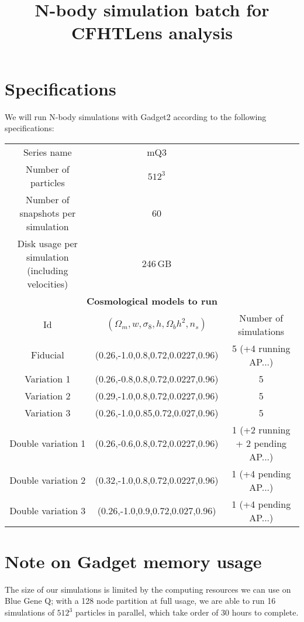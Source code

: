\documentclass[11pt]{article}
\begin{document}
\title{N-body simulation batch for CFHTLens analysis}
\author{}
\date{}

\maketitle

\section*{Specifications}

We will run N-body simulations with Gadget2 according to the following specifications:

\begin{table}[h!]
\begin{center}
\begin{tabular}{ccc} \hline
Series name & mQ3 & \\
Number of particles & $512^3$ & \\ 
Number of snapshots per simulation & 60 & \\
Disk usage per simulation (including velocities) & 246\,GB& \\ \hline
\multicolumn{3}{c}{\textbf{Cosmological models to run}} \\
Id & $(\Omega_m,w,\sigma_8,h,\Omega_bh^2,n_s)$ & Number of simulations\\ \hline
Fiducial & (0.26,-1.0,0.8,0.72,0.0227,0.96) & 5 (+4 running AP...) \\
Variation 1 & (0.26,-0.8,0.8,0.72,0.0227,0.96) & 5 \\
Variation 2 & (0.29,-1.0,0.8,0.72,0.0227,0.96) & 5 \\
Variation 3 & (0.26,-1.0,0.85,0.72,0.027,0.96) & 5 \\ \hline
Double variation 1 & (0.26,-0.6,0.8,0.72,0.0227,0.96) & 1 (+2 running + 2 pending AP...) \\
Double variation 2 & (0.32,-1.0,0.8,0.72,0.0227,0.96) & 1 (+4 pending AP...) \\
Double variation 3 & (0.26,-1.0,0.9,0.72,0.027,0.96) & 1 (+4 pending AP...) \\ \hline
\end{tabular}
\end{center}
\end{table}

\section*{Note on Gadget memory usage}
The size of our simulations is limited by the computing resources we can use on Blue Gene Q; with a 128 node partition at full usage, we are able to run 16 simulations of $512^3$ particles in parallel, which take order of 30 hours to complete. 
\end{document}
